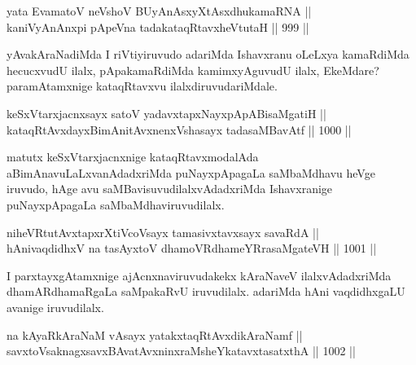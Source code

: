 \begin{shl}
yata EvamatoV neVshoV BUyAnAsxyXtAsxdhukamaRNA || \\
kaniVyAnAnxpi pApeVna tadakataqRtavxheVtutaH \hfill || 999 ||  
\end{shl}

\begin{artha}
yAvakAraNadiMda I riVtiyiruvudo adariMda Ishavxranu oLeLxya kamaRdiMda hecucxvudU ilalx, pApakamaRdiMda kamimxyAguvudU ilalx, EkeMdare? paramAtamxnige kataqRtavxvu ilalxdiruvudariMdale.
\end{artha}

\begin{shl}
keSxVtarxjacnxsayx satoV yadavxtapxNayxpApABisaMgatiH || \\
kataqRtAvxdayxBimAnitAvxnenxVshasayx tadasaMBavAtf \hfill || 1000 ||  
\end{shl}

\begin{artha}
matutx keSxVtarxjacnxnige kataqRtavxmodalAda aBimAnavuLaLxvanAdadxriMda puNayxpApagaLa saMbaMdhavu heVge iruvudo, hAge avu saMBavisuvudilalxvAdadxriMda Ishavxranige puNayxpApagaLa saMbaMdhaviruvudilalx.
\end{artha}

\begin{shl}
\footnotemark[1]niheVRtutAvxtapxrXtiVcoV\s sayx tamasivxtavxsayx savaRdA || \\
hAnivaqdidhxV na tasAyxtoV dhamoVRdhameYRrasaMgateVH \hfill || 1001 ||  
\end{shl}

\begin{artha}
 I parxtayxgAtamxnige ajAcnxnaviruvudakekx kAraNaveV ilalxvAdadxriMda dhamARdhamaRgaLa saMpakaRvU iruvudilalx. adariMda hAni vaqdidhxgaLU avanige iruvudilalx.
\end{artha}


\begin{shl}
na kAyaRkAraNaM vA\s sayx yatakxtaqRtAvxdikAraNamf || \\
savxtoV\s saknagxsavxBAvatAvxninxraMsheYkatavxtasatxthA \hfill || 1002 ||  
\end{shl}


